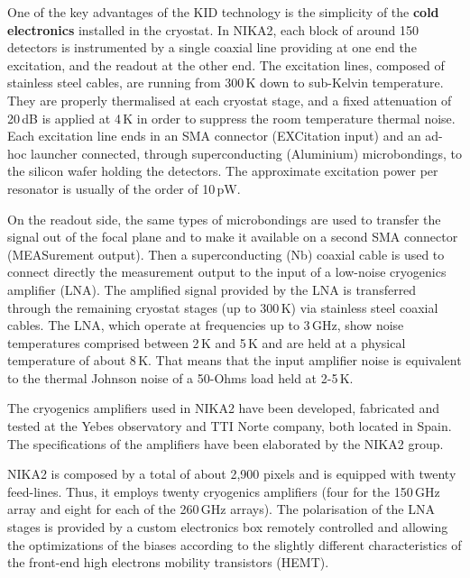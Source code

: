 \documentclass[]{aa} %
\begin{document}
One of the key advantages of the KID technology is the simplicity of the
{\bf{cold electronics}} installed in the cryostat.  In NIKA2, each block of
around 150 detectors is instrumented by a single coaxial line providing at one
end the excitation, and the readout at the other end. The excitation lines,
composed of stainless steel cables, are running from 300\,K down to sub-Kelvin
temperature. They are properly thermalised at each cryostat stage, and a fixed
attenuation of 20\,dB is applied at 4\,K in order to suppress the room
temperature thermal noise. Each excitation line ends in an SMA connector
(EXCitation input) and an ad-hoc launcher connected, through superconducting
(Aluminium) microbondings, to the silicon wafer holding the detectors. The
approximate excitation power per resonator is usually of the order of 10\,pW.

On the readout side, the same types of microbondings are used to transfer the
signal out of the focal plane and to make it available on a second SMA connector
(MEASurement output). Then a superconducting (Nb) coaxial cable is used to
connect directly the measurement output to the input of a low-noise cryogenics
amplifier (LNA). The amplified signal provided by the LNA is transferred through
the remaining cryostat stages (up to 300\,K) via stainless steel coaxial
cables. The LNA, which operate at frequencies up to 3\,GHz, show noise
temperatures comprised between 2\,K and 5\,K and are held at a physical
temperature of about 8\,K. That means that the input amplifier noise is
equivalent to the thermal Johnson noise of a 50-Ohms load held at 2-5\,K.

The cryogenics amplifiers used in NIKA2 have been developed, fabricated and
tested at the Yebes observatory and TTI Norte company, both located in
Spain. The specifications of the amplifiers have been elaborated by the NIKA2
group.

NIKA2 is composed by a total of about 2,900 pixels and is equipped with twenty
feed-lines. Thus, it employs twenty cryogenics amplifiers (four for the 150\,GHz
array and eight for each of the 260\,GHz arrays). The polarisation of the LNA
stages is provided by a custom electronics box remotely controlled and allowing
the optimizations of the biases according to the slightly different
characteristics of the front-end high electrons mobility transistors (HEMT).
\end{document}

